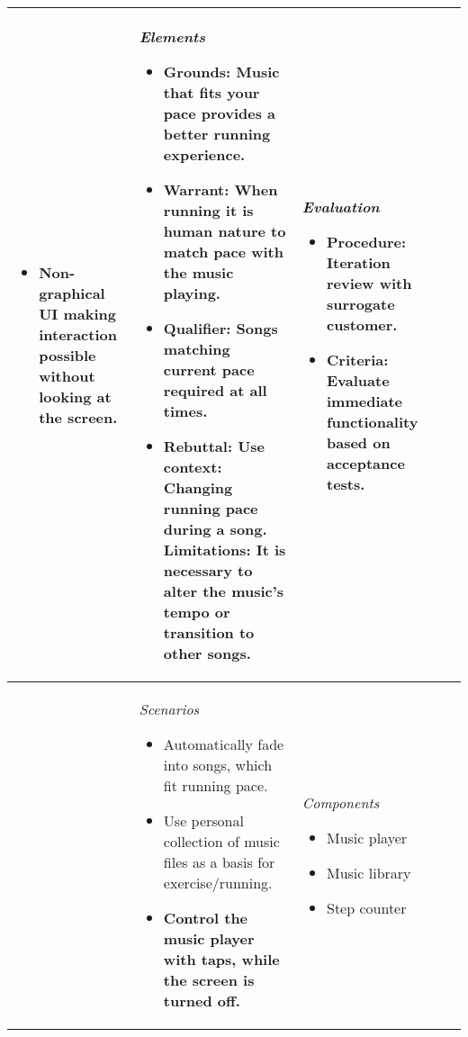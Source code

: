 \begin{table}
\begin{tabular}{|l|l|l|l|l|}
{\begin{itemize}[leftmargin=*]
		\item {\color{darkGreen} \textbf{Non-graphical UI making interaction possible without looking at the screen.}}
		\end{itemize}
	}
	& \parbox[t][][c]{0.20\textwidth}{
		\textit{Elements}
		\begin{itemize}[leftmargin=*] 
		\item Grounds: 
		Music that fits your pace provides a better running experience. 
		\item Warrant: 
		When running it is human nature to match pace with the music playing. 
		\item Qualifier:
		Songs matching current pace required at all times.
		\item Rebuttal: \newline
		Use context: \newline
		Changing running pace during a song. \newline 
		Limitations: 
		It is necessary to alter the music's tempo or transition to other songs.
		\end{itemize}
	}
	& \parbox[t][][c]{0.20\textwidth}{ 
		\textit{Evaluation}
		\begin{itemize}[leftmargin=*]
		\item Procedure:  Iteration review with surrogate customer.
		\item Criteria:  Evaluate immediate functionality based on acceptance tests.
		\end{itemize}		
	}\\ \hline
\parbox[t][3.5cm][c]{0.02\textwidth}{}
	& \parbox[t][][c]{0.20\textwidth}{ 
		\textit{Scenarios}
		\begin{itemize}[leftmargin=*]
		\item Automatically fade into songs, which fit running pace.
		\item Use personal collection of music files as a basis for exercise/running.
		\item {\color{darkGreen} \textbf{Control the music player with taps, while the screen is turned off.}}
		\end{itemize}
	}
	& \parbox[t][][c]{0.20\textwidth}{ 
		\textit{Components}
		\begin{itemize}[leftmargin=*]
		\item Music player
		\item Music library
		\item Step counter
		\end{itemize}
	}
	& \parbox[t][][c]{0.20\textwidth}{ 
}
\end{tabular}
\end{table}
